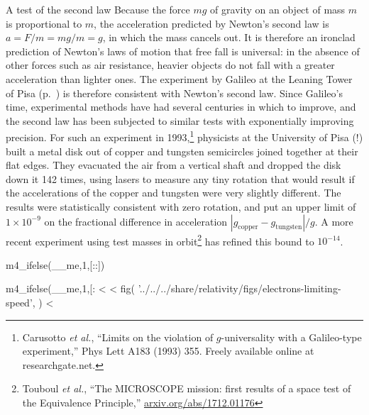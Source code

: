 \begin{eg}{A test of the second law}\label{eg:carusotto}
Because the force $mg$ of gravity on an object of mass $m$ is proportional to $m$,
the acceleration predicted by Newton's second law is $a=F/m=mg/m=g$, in which the mass
cancels out. It is therefore an ironclad prediction of Newton's laws of motion that
free fall is universal: in the absence of other forces such as air resistance,
heavier objects do not fall with a greater acceleration than lighter ones. 
The experiment by Galileo at the Leaning Tower of Pisa (p.~\pageref{fig:galileo-drops-balls})
is therefore consistent with Newton's second law. Since Galileo's time, experimental methods
have had several centuries in which to improve, and the second law has been subjected to similar
tests with exponentially improving precision. For such an experiment in 
1993,\footnote{Carusotto \emph{et al.}, ``Limits on the violation of $g$-universality with a
Galileo-type experiment,'' Phys Lett A183 (1993) 355. Freely available online at
researchgate.net.} physicists at the University of Pisa (!) built a metal disk out of
copper and tungsten semicircles joined together at their flat edges. They evacuated the air
from a vertical shaft and dropped the disk down it 142 times, using lasers to measure any
tiny rotation that would result if the accelerations of the copper and tungsten were very slightly
different. The results were statistically consistent with zero rotation, and put an upper limit
of $1\times10^{-9}$ on the fractional difference in acceleration $|g_\text{copper}-g_{\text{tungsten}}|/g$.
A more recent experiment using test masses in orbit\footnote{Touboul \emph{et al.},
``The MICROSCOPE mission: first results of a space test of the
Equivalence Principle,'' \url{arxiv.org/abs/1712.01176}}
has refined this bound to $10^{-14}$.
\end{eg}

m4_ifelse(__me,1,[:\pagebreak[4]:])

m4_ifelse(__me,1,[:
<%
<%
  fig(
    '../../../share/relativity/figs/electrons-limiting-speed',
  )
<%

